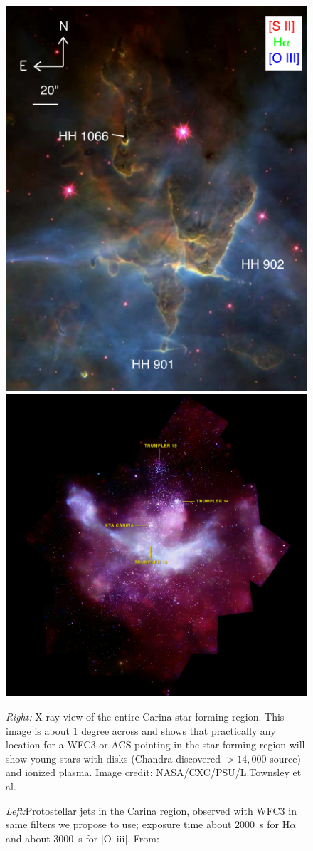 \documentclass[12pt]{article}
\begin{document}
\begin{figure}
    \centering
    \includegraphics[width=.45\textwidth]{reiter13_fig3.png}
    \includegraphics[width=.54\textwidth]{carina_xray_label.jpg}
    \caption{\emph{Left:}Protostellar jets in the Carina region, observed with WFC3 in same filters we propose to use; exposure time about 2000~s for H$\alpha$ and about 3000~s for [O~{\sc iii}]. From: \citet{2013MNRAS.433.2226R}} \emph{Right:} X-ray view of the entire Carina star forming region. This image is about 1 degree across and shows that practically any location for a WFC3 or ACS pointing in the star forming region will show young stars with disks (Chandra discovered $> 14,000$ source) and ionized plasma. Image credit: NASA/CXC/PSU/L.Townsley et al.
    \label{fig:reiter}
\end{figure}
\end{document}
